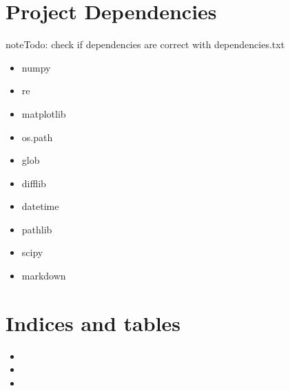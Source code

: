 \documentclass[letterpaper,10pt,english]{sphinxmanual}
\begin{document}
\chapter{Project Dependencies}
\label{\detokenize{index:project-dependencies}}
\begin{sphinxadmonition}{note}{\label{index:index-0}Todo:}
check if dependencies are correct with dependencies.txt
\end{sphinxadmonition}
\begin{itemize}
\item {} 
numpy

\item {} 
re

\item {} 
matplotlib

\item {} 
os.path

\item {} 
glob

\item {} 
difflib

\item {} 
datetime

\item {} 
pathlib

\item {} 
scipy

\item {} 
markdown

\end{itemize}


\chapter{Indices and tables}
\label{\detokenize{index:indices-and-tables}}\begin{itemize}
\item {} 

\item {} 

\item {} 

\end{itemize}


\renewcommand{\indexname}{Python Module Index}
\begin{sphinxtheindex}
\let\bigletter\sphinxstyleindexlettergroup
\bigletter{f}
\item\relax{}
\end{sphinxtheindex}

\renewcommand{\indexname}{Index}
\printindex
\end{document}
